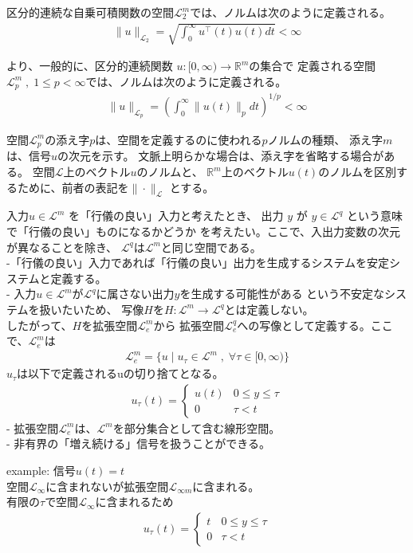 \documentclass{jsarticle}
\begin{document}
区分的連続な自乗可積関数の空間$\mathcal L^m_2$では、ノルムは次のように定義される。
\begin{align}
  \|u\|_{\mathcal L_2} = \sqrt{\int^\infty_0 u^\top(t)u(t)dt} < \infty
\end{align}

より、一般的に、区分的連続関数 $u:[0,\infty)\rightarrow \mathbb R^m$の集合で
定義される空間$\mathcal L^m_p\;,\;1\leq p<\infty$では、ノルムは次のように定義される。
\begin{align}
  \|u\|_{\mathcal L_p} = \left( \int^\infty_0 \|u(t)\|_p dt \right)^{1/p} < \infty
\end{align}

空間$\mathcal L_p^m$の添え字$p$は、空間を定義するのに使われる$p$ノルムの種類、
添え字$m$は、信号$u$の次元を示す。
文脈上明らかな場合は、添え字を省略する場合がある。
空間$\mathcal L$上のベクトル$u$のノルムと、
$\mathbb R^m$上のベクトル$u(t)$のノルムを区別するために、前者の表記を$\|\cdot \|_{\mathcal L}$
とする。

入力$u \in  \mathcal L^m $ を「行儀の良い」入力と考えたとき、
出力 $y$ が $y \in \mathcal L^q$ という意味で「行儀の良い」ものになるかどうか
を考えたい。ここで、入出力変数の次元が異なることを除き、
$\mathcal L^q$は$\mathcal L^m$と同じ空間である。\\
-「行儀の良い」入力であれば「行儀の良い」出力を生成するシステムを安定システムと定義する。\\
- 入力$u \in \mathcal L^m$が$\mathcal L^q$に属さない出力$y$を生成する可能性がある
という不安定なシステムを扱いたいため、
写像$H$を$H:\mathcal L^m \rightarrow \mathcal L^q$とは定義しない。\\
\newpage
したがって、$H$を拡張空間$\mathcal L^m_e$から
拡張空間$\mathcal L^q_e$への写像として定義する。ここで、$\mathcal L^m_e$は
\begin{align}
  \mathcal L^m_e = \{u \mid u_\tau \in \mathcal L^m\;,\;\forall \tau \in [0,\infty)\}
\end{align}
$u_\tau$は以下で定義されるuの切り捨てとなる。
\begin{align}
  u_\tau(t) = \begin{cases}
    u(t) &0\leq y\leq \tau\\
    0& \tau < t
  \end{cases}
\end{align}
- 拡張空間$\mathcal L^m_e$は、$\mathcal L^m$を部分集合として含む線形空間。\\
- 非有界の「増え続ける」信号を扱うことができる。

example: 信号$u(t) = t$\\
空間$\mathcal L_\infty$に含まれないが拡張空間$\mathcal L_{\infty m}$に含まれる。\\
有限の$\tau$で空間$\mathcal L_\infty$に含まれるため
\begin{align}
  u_\tau(t) = \begin{cases}
    t &0\leq y\leq \tau\\
    0& \tau < t
  \end{cases} 
\end{align}
\end{document}
